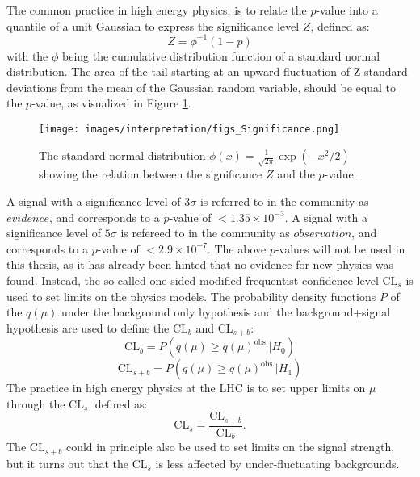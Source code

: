 The common practice in high energy physics, is to relate the $p$-value into a quantile of a unit Gaussian to express the significance level $Z$, defined as:
\begin{equation}
Z=\phi^{-1}(1-p)
\end{equation}
with the $\phi$ being the cumulative distribution function of a standard normal distribution. 
The area of the tail starting at an upward fluctuation of Z standard deviations from the mean of the Gaussian random variable, should be equal to the $p$-value, as visualized in Figure \ref{fig:pvalue}.
\begin{figure}[!hbtp]
\centering
\texttt{[image: images/interpretation/figs\_Significance.png]}
\caption{The standard normal distribution $\phi(x)=\frac{1}{\sqrt{2\pi}}\exp(-x^{2}/2)$ showing the relation between the significance $Z$ and the $p$-value \cite{Cowan:2010js}.}
\label{fig:pvalue}
\end{figure}
A signal with a significance level of $3\sigma$ is referred to in the community as $evidence$, and corresponds to a $p$-value of $<1.35\times10^{-3}$. 
A signal with a significance level of $5\sigma$ is refereed to in the community as $observation$, and corresponds to a $p$-value of $<2.9\times10^{-7}$. 
The above $p$-values will not be used in this thesis, as it has already been hinted that no evidence for new physics was found. 
Instead, the so-called one-sided modified frequentist confidence level $\mathrm{CL}_{s}$ \cite{Cowan:2010js} is used to set limits on the physics models.                                              
The probability density functions $P$ of the $q(\mu)$ under the background only hypothesis and the background+signal hypothesis are used to define the $\mathrm{CL}_{b}$ and $\mathrm{CL}_{s+b}$:
\begin{equation}
\mathrm{CL}_{b}=P(q(\mu)\geq q(\mu)^{\mathrm{obs.}}|H_{0})
\end{equation} 
\begin{equation}
\mathrm{CL}_{s+b}=P(q(\mu)\geq q(\mu)^{\mathrm{obs.}}|H_{1})
\end{equation} 
The practice in high energy physics at the LHC is to set upper limits on $\mu$ through the $\mathrm{CL}_{s}$, defined as:
\begin{equation}
\mathrm{CL}_{s}=\frac{\mathrm{CL}_{s+b}}{\mathrm{CL}_{b}}.
\end{equation} 
The $\mathrm{CL}_{s+b}$ could in principle also be used to set limits on the signal strength, but it turns out that the $\mathrm{CL}_{s}$ is less affected by under-fluctuating backgrounds. 

